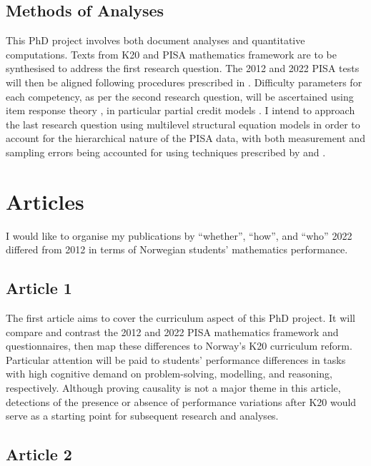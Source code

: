\documentclass[
    a4paper,                %
    11pt,                   %
    stu,                    %
    donotrepeattitle,       %
    floatsintext,           %
    biblatex,               %
    colorlinks=true,        %
    linkcolor=red,          %
    anchorcolor=black,      %
    citecolor=blue,         %
    urlcolor=blue,          %
    bookmarks=true,         %
    bookmarksopen=false,    %
    bookmarksnumbered=true, %
    dvipsnames              %
]{apa7}
\begin{document}
\subsection{Methods of Analyses}

This PhD project involves both document analyses and quantitative computations. Texts from K20 \parencite{udir:2020} and PISA mathematics framework \parencite{oecd:2013,oecd:2018} are to be synthesised to address the first research question. The 2012 and 2022 PISA tests will then be aligned following procedures prescribed in \textcite{kolen:2014}. Difficulty parameters for each competency, as per the second research question, will be ascertained using item response theory \parencite{deayala:2022}, in particular partial credit models \parencite{masters:1982}. I intend to approach the last research question using multilevel structural equation models in order to account for the hierarchical nature of the PISA data, with both measurement and sampling errors being accounted for using techniques prescribed by \textcite{ludtke:2008} and \textcite{marsh:2009}.

\section{Articles}

I would like to organise my publications by ``whether'', ``how'', and ``who'' 2022 differed from 2012 in terms of Norwegian students' mathematics performance.

\subsection{Article 1}

The first article aims to cover the curriculum aspect of this PhD project. It will compare and contrast the 2012 and 2022 PISA mathematics framework and questionnaires, then map these differences to Norway's K20 curriculum reform. Particular attention will be paid to students' performance differences in tasks with high cognitive demand on problem-solving, modelling, and reasoning, respectively. Although proving causality is not a major theme in this article, detections of the presence or absence of performance variations after K20 would serve as a starting point for subsequent research and analyses.

\subsection{Article 2}
\end{document}
